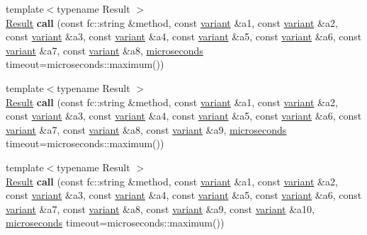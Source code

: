 \begin{Indent}
\begin{DoxyCompactItemize}
\item 
\mbox{\label{classfc_1_1rpc_1_1json__connection_afdbe5ac675cf76008c2d4d82746dd842}} 
{\footnotesize template$<$typename Result $>$ }\\\mbox{\hyperlink{struct_result}{Result}} {\bfseries call} (const fc\+::string \&method, const \mbox{\hyperlink{classfc_1_1variant}{variant}} \&a1, const \mbox{\hyperlink{classfc_1_1variant}{variant}} \&a2, const \mbox{\hyperlink{classfc_1_1variant}{variant}} \&a3, const \mbox{\hyperlink{classfc_1_1variant}{variant}} \&a4, const \mbox{\hyperlink{classfc_1_1variant}{variant}} \&a5, const \mbox{\hyperlink{classfc_1_1variant}{variant}} \&a6, const \mbox{\hyperlink{classfc_1_1variant}{variant}} \&a7, const \mbox{\hyperlink{classfc_1_1variant}{variant}} \&a8, \mbox{\hyperlink{classfc_1_1microseconds}{microseconds}} timeout=microseconds\+::maximum())
\item 
\mbox{\label{classfc_1_1rpc_1_1json__connection_a9723d9cd48e6450fcc39a8d2fedf3502}} 
{\footnotesize template$<$typename Result $>$ }\\\mbox{\hyperlink{struct_result}{Result}} {\bfseries call} (const fc\+::string \&method, const \mbox{\hyperlink{classfc_1_1variant}{variant}} \&a1, const \mbox{\hyperlink{classfc_1_1variant}{variant}} \&a2, const \mbox{\hyperlink{classfc_1_1variant}{variant}} \&a3, const \mbox{\hyperlink{classfc_1_1variant}{variant}} \&a4, const \mbox{\hyperlink{classfc_1_1variant}{variant}} \&a5, const \mbox{\hyperlink{classfc_1_1variant}{variant}} \&a6, const \mbox{\hyperlink{classfc_1_1variant}{variant}} \&a7, const \mbox{\hyperlink{classfc_1_1variant}{variant}} \&a8, const \mbox{\hyperlink{classfc_1_1variant}{variant}} \&a9, \mbox{\hyperlink{classfc_1_1microseconds}{microseconds}} timeout=microseconds\+::maximum())
\item 
\mbox{\label{classfc_1_1rpc_1_1json__connection_ac5ef127afbc960ee0b14625d9e2dbb9c}} 
{\footnotesize template$<$typename Result $>$ }\\\mbox{\hyperlink{struct_result}{Result}} {\bfseries call} (const fc\+::string \&method, const \mbox{\hyperlink{classfc_1_1variant}{variant}} \&a1, const \mbox{\hyperlink{classfc_1_1variant}{variant}} \&a2, const \mbox{\hyperlink{classfc_1_1variant}{variant}} \&a3, const \mbox{\hyperlink{classfc_1_1variant}{variant}} \&a4, const \mbox{\hyperlink{classfc_1_1variant}{variant}} \&a5, const \mbox{\hyperlink{classfc_1_1variant}{variant}} \&a6, const \mbox{\hyperlink{classfc_1_1variant}{variant}} \&a7, const \mbox{\hyperlink{classfc_1_1variant}{variant}} \&a8, const \mbox{\hyperlink{classfc_1_1variant}{variant}} \&a9, const \mbox{\hyperlink{classfc_1_1variant}{variant}} \&a10, \mbox{\hyperlink{classfc_1_1microseconds}{microseconds}} timeout=microseconds\+::maximum())

\end{DoxyCompactItemize}
\end{Indent}
